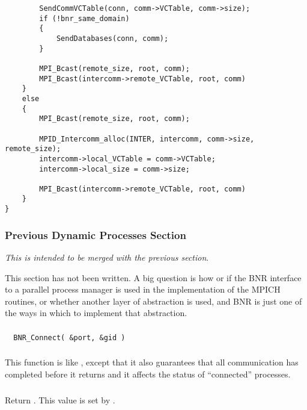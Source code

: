 \documentclass{article}
\begin{document}
\begin{verbatim}
        SendCommVCTable(conn, comm->VCTable, comm->size);
        if (!bnr_same_domain)
        {
            SendDatabases(conn, comm);
        }
        
        MPI_Bcast(remote_size, root, comm);
        MPI_Bcast(intercomm->remote_VCTable, root, comm)
    }
    else
    {
        MPI_Bcast(remote_size, root, comm);
        
        MPID_Intercomm_alloc(INTER, intercomm, comm->size, remote_size);
        intercomm->local_VCTable = comm->VCTable;
        intercomm->local_size = comm->size;
        
        MPI_Bcast(intercomm->remote_VCTable, root, comm)
    }
}
\end{verbatim}


\subsubsection{Previous Dynamic Processes Section }
\label{sec:spawn-impl}

{\em This is intended to be merged with the previous section}.


This section has not been written.  A big question is how or if the BNR
interface to a parallel process manager is used in the implementation
of the MPICH routines, or whether another layer of abstraction is
used, and BNR is just one of the ways in which to implement that abstraction.

\subsubsection{}

\begin{verbatim}
  BNR_Connect( &port, &gid )
\end{verbatim}

\subsubsection{}
This function is like , except that it also guarantees
that all communication has completed before it returns and it affects the
status of ``connected'' processes.



\subsubsection{}
Return .  This value is set by
. 
\end{document}
